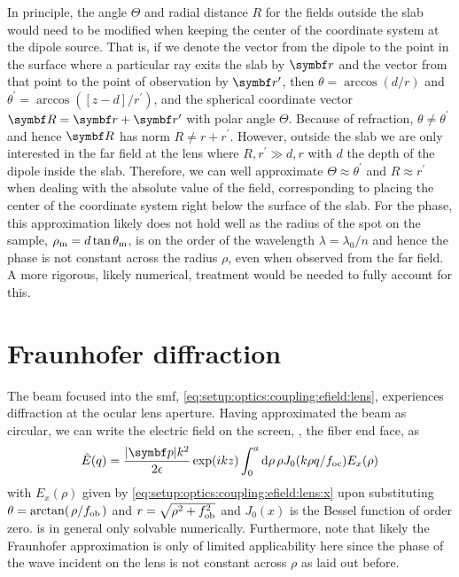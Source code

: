 In principle, the angle $\Theta$ and radial distance $R$ for the fields outside the slab would need to be modified when keeping the center of the coordinate system at the dipole source.
That is, if we denote the vector from the dipole to the point in the surface where a particular ray exits the slab by $\bvec{r}$ and the vector from that point to the point of observation by $\bvec{r}^{\prime}$, then $\theta = \arccos(d/r)$ and $\theta^{\prime} = \arccos([z-d]/r^{\prime})$, and the spherical coordinate vector $\bvec{R} = \bvec{r} + \bvec{r}^{\prime}$ with polar angle $\Theta$.
Because of refraction, $\theta\neq\theta^{\prime}$ and hence $\bvec{R}$ has norm $R\neq r + r^{\prime}$.
However, outside the slab we are only interested in the far field at the lens where $R,r^{\prime}\gg d,r$ with $d$ the depth of the dipole inside the slab.
Therefore, we can well approximate $\Theta\approx\theta^{\prime}$ and $R\approx r^{\prime}$ when dealing with the absolute value of the field, corresponding to placing the center of the coordinate system right below the surface of the slab.
For the phase, this approximation likely does not hold well as the radius of the spot on the sample, $\rho_{\mathrm{m}} = d\tan\theta_{\mathrm{m}}$, is on the order of the wavelength $\lambda = \lambda_0/n$ and hence the phase is not constant across the radius $\rho$, even when observed from the far field.
A more rigorous, likely numerical, treatment would be needed to fully account for this.

\section{Fraunhofer diffraction}\label{sec:app:setup:optics:diffraction}
The beam focused into the \gls{smf}, \cref{eq:setup:optics:coupling:efield:lens}, experiences diffraction at the ocular lens aperture.
Having approximated the beam as circular, we can write the electric field on the screen, \ie, the fiber end face, as~\cite{Hecht2017}
\begin{equation}\label{eq:app:setup:optics:diffraction}
    \tilde{E}(q) = \frac{\abs{\bvec{p}}k^2}{2\epsilon}\exp(\i k z)\int_0^a\dd{\rho}\rho J_0(k\rho q/\foc) E_x(\rho)
\end{equation}
with $E_x(\rho)$ given by \cref{eq:setup:optics:coupling:efield:lens:x} upon substituting $\theta = \arctan(\flatfrac{\rho}{\fob})$ and $r=\sqrt{\rho^2 + f_{\mathrm{ob}}^2}$ and $J_0(x)$ is the Bessel function of order zero.
 is in general only solvable numerically.
Furthermore, note that likely the Fraunhofer approximation is only of limited applicability here since the phase of the wave incident on the lens is not constant across $\rho$ as laid out before.
